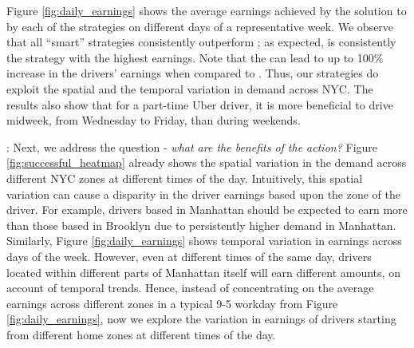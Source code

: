 Figure \ref{fig:daily_earnings} shows the average earnings achieved by 
the solution to {\originalproblem} by each of the strategies on different days of a representative week. We observe that all ``smart'' strategies consistently outperform {\naive};
as expected, {\relocationflexible} is consistently the strategy with the highest earnings.
Note that the {\relocationflexible} can lead to up to 100\% increase in the drivers'
earnings when compared to {\naive}.  
Thus, our strategies do exploit the spatial and the temporal variation in demand across NYC. The results also show
that for a part-time Uber driver, it is more beneficial to drive midweek, from Wednesday to Friday, than during weekends.





: 
Next, we address the question - \textit{what are the benefits of the {\relocate} action?} Figure \ref{fig:successful_heatmap} already shows the spatial variation in the demand across different NYC zones at different times of the day.
Intuitively, this spatial variation can cause a disparity in the driver earnings based upon the zone of the driver. For example, drivers based in Manhattan should be expected 
to earn more than those based in Brooklyn due to persistently higher demand in Manhattan. Similarly, Figure \ref{fig:daily_earnings} shows temporal variation in earnings across days of the week. However, even
at different times of the same day, drivers located within different parts of Manhattan itself will earn different amounts, 
on account of temporal trends.
Hence, instead of concentrating on the average earnings across different zones in a typical 9-5 workday from Figure \ref{fig:daily_earnings}, now we explore
the variation in earnings of drivers starting from different home zones at different times of the day.


